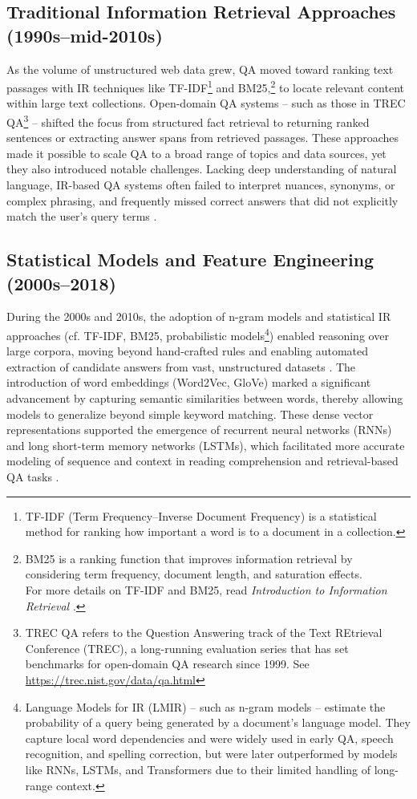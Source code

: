 \begin{spacing}{1.5}
\subsection{Traditional Information Retrieval Approaches (1990s--mid-2010s)}
As the volume of unstructured web data grew, QA moved toward ranking text passages with IR techniques like TF-IDF\footnote{TF-IDF (Term Frequency–Inverse Document Frequency) is a statistical method for ranking how important a word is to a document in a collection.} and BM25,\footnote{BM25 is a ranking function that improves information retrieval by considering term frequency, document length, and saturation effects.\\For more details on TF-IDF and BM25, read \textit{Introduction to Information Retrieval} \citep{manning_introduction_2008}.} to locate relevant content within large text collections. Open-domain QA systems -- such as those in TREC QA\footnote{TREC QA refers to the Question Answering track of the Text REtrieval Conference (TREC), a long-running evaluation series that has set benchmarks for open-domain QA research since 1999. See \url{https://trec.nist.gov/data/qa.html}} \citep{hirschman_natural_2001} -- shifted the focus from structured fact retrieval to returning ranked sentences or extracting answer spans from retrieved passages. These approaches made it possible to scale QA to a broad range of topics and data sources, yet they also introduced notable challenges. Lacking deep understanding of natural language, IR-based QA systems often failed to interpret nuances, synonyms, or complex phrasing, and frequently missed correct answers that did not explicitly match the user’s query terms \citep{antoniou_survey_2022, caballero_brief_2021}.

\subsection{Statistical Models and Feature Engineering (2000s--2018)}
During the 2000s and 2010s, the adoption of n-gram models and statistical IR approaches (cf. TF-IDF, BM25, probabilistic models\footnote{Language Models for IR (LMIR) -- such as n-gram models -- estimate the probability of a query being generated by a document's language model. They capture local word dependencies and were widely used in early QA, speech recognition, and spelling correction, \citep{ponte_language_1998} but were later outperformed by models like RNNs, LSTMs, and Transformers due to their limited handling of long-range context.}) enabled reasoning over large corpora, moving beyond hand-crafted rules and enabling automated extraction of candidate answers from vast, unstructured datasets \citep{manning_introduction_2008}. The introduction of word embeddings (Word2Vec, GloVe) marked a significant advancement by capturing semantic similarities between words, thereby allowing models to generalize beyond simple keyword matching. These dense vector representations supported the emergence of recurrent neural networks (RNNs) and long short-term memory networks (LSTMs), which facilitated more accurate modeling of sequence and context in reading comprehension and retrieval-based QA tasks \citep{jurafsky_chapter_2024}. 


\end{spacing}
